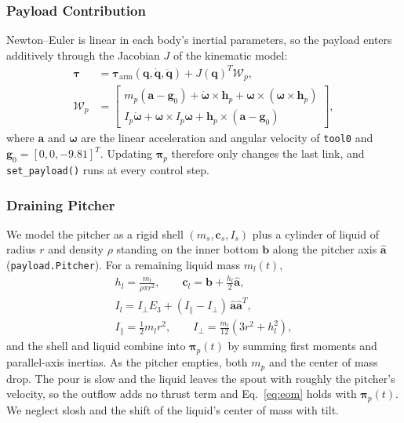 \documentclass[conference]{IEEEtran}
\begin{document}
\subsubsection{Payload Contribution}
Newton--Euler is linear in each body's inertial parameters, so the payload enters additively 
through the Jacobian $J$ of the kinematic model:
\begin{align}
    \boldsymbol\tau &= \boldsymbol\tau_{\text{arm}}(\mathbf q,\dot{\mathbf q},
        \ddot{\mathbf q}) + J(\mathbf q)^T\mathcal W_p ,
    \label{eq:taup}\\
    \mathcal W_p &= \begin{bmatrix}
        m_p(\mathbf a-\mathbf g_0)+\dot{\boldsymbol\omega}\times\mathbf h_p
            +\boldsymbol\omega\times(\boldsymbol\omega\times\mathbf h_p)\\
        I_p\dot{\boldsymbol\omega}+\boldsymbol\omega\times I_p\boldsymbol\omega
            +\mathbf h_p\times(\mathbf a-\mathbf g_0)
    \end{bmatrix},
    \nonumber
\end{align}
where $\mathbf a$ and $\boldsymbol\omega$ are the linear acceleration and angular velocity of 
\texttt{tool0} and $\mathbf g_0=[0,0,-9.81]^T$. Updating $\boldsymbol\pi_p$ therefore only 
changes the last link, and \texttt{set\_payload()} runs at every control step.

\subsubsection{Draining Pitcher}
We model the pitcher as a rigid shell $(m_s,\mathbf c_s,I_s)$ plus a cylinder of liquid of 
radius $r$ and density $\rho$ standing on the inner bottom $\mathbf b$ along the pitcher axis 
$\hat{\mathbf a}$ (\texttt{payload.Pitcher}). For a remaining liquid mass $m_l(t)$,
\begin{gather}
    h_l=\frac{m_l}{\rho\pi r^2},\qquad
    \mathbf c_l=\mathbf b+\tfrac{h_l}{2}\hat{\mathbf a},\\
    I_l=I_\perp E_3+(I_\parallel-I_\perp)\,\hat{\mathbf a}\hat{\mathbf a}^T,
    \nonumber\\
    I_\parallel=\tfrac12 m_lr^2,\qquad I_\perp=\tfrac{m_l}{12}(3r^2+h_l^2),
    \nonumber
\end{gather}
and the shell and liquid combine into $\boldsymbol\pi_p(t)$ by summing first moments and 
parallel-axis inertias. As the pitcher empties, both $m_p$ and the center of mass drop. The pour 
is slow and the liquid leaves the spout with roughly the pitcher's velocity, so the outflow adds 
no thrust term and Eq.~\eqref{eq:eom} holds with $\boldsymbol\pi_p(t)$. We neglect slosh and the 
shift of the liquid's center of mass with tilt.
\end{document}
